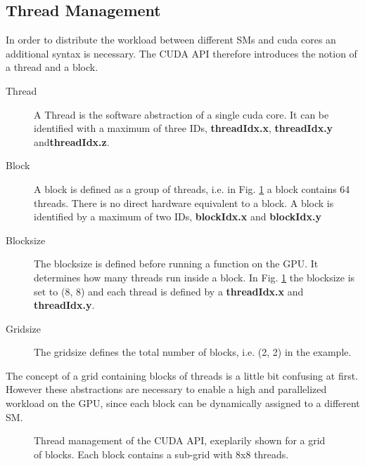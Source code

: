 \clearpage

\subsection{Thread Management}
\label{cuda:sec_threadmanage}

In order to distribute the workload between different SMs and cuda cores an additional syntax is necessary.
The CUDA API therefore  introduces the notion of a thread and a block.

\begin{description}
    \item[Thread] A Thread is the software abstraction of a single cuda core. It can be identified with
                   a maximum of three IDs, \textbf{threadIdx.x}, \textbf{threadIdx.y} and\textbf{threadIdx.z}.

    \item[Block] A block is defined as a group of threads, i.e. in Fig. \ref{cuda:grid_example} a block contains 64 threads.
                 There  is no direct hardware equivalent to a block.
                 A block is identified by a maximum of two IDs, \textbf{blockIdx.x} and \textbf{blockIdx.y}

    \item[Blocksize] The blocksize is defined before running a function on the GPU. It determines how
                    many threads run inside a block. In Fig. \ref{cuda:grid_example} the blocksize is set to (8, 8) and
                    each thread is defined by a \textbf{threadIdx.x} and \textbf{threadIdx.y}.

    \item[Gridsize] The gridsize defines the total number of blocks, i.e. (2, 2) in the example.
\end{description}

The concept of a grid containing blocks of threads is a little bit confusing at first.
However these abstractions are necessary to enable a high and parallelized workload on the GPU,
since each block can be dynamically assigned to a different SM.


\begin{figure}[!bp]
      \centering
       \caption{Thread management of the CUDA API, exeplarily shown for a
        grid of blocks.  Each block contains a sub-grid with 8x8 threads.}
       \label{cuda:grid_example}
\end{figure}


